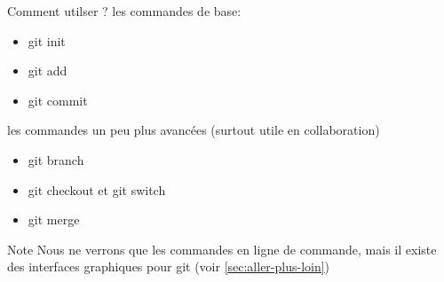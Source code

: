 \documentclass[usenames,dvipsnames]{beamer}
\begin{document}
\begin{frame}[fragile]{Comment utilser ?}
	les commandes de base:
	\begin{itemize}
		\item git init
		\item git add
		\item git commit
	\end{itemize}

	les commandes un peu plus avancées (surtout utile en collaboration)
	\begin{itemize}
		\item git branch
		\item git checkout et git switch
		\item git merge
	\end{itemize}

	\begin{alertblock}{Note}
		Nous ne verrons que les commandes en ligne de commande, mais il existe des interfaces graphiques pour git (voir \ref{sec:aller-plus-loin})
	\end{alertblock}
\end{frame}
\end{document}
